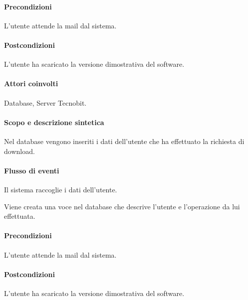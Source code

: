 \paragraph{Precondizioni} L'utente attende la mail dal sistema.
\paragraph{Postcondizioni} L'utente ha scaricato la versione dimostrativa del software.

\paragraph{Attori coinvolti}Database, Server Tecnobit.
\paragraph{Scopo e descrizione sintetica}
Nel database vengono inseriti i dati dell'utente che ha effettuato la richiesta di download.
\paragraph{Flusso di eventi}
\begin{elenconumerato}[\textbf{}]{\subsubsecindent}
\item Il sistema raccoglie i dati dell'utente.
\item Viene creata una voce nel database che descrive l'utente e l'operazione da lui effettuata.
\end{elenconumerato}
\paragraph{Precondizioni} L'utente attende la mail dal sistema.
\paragraph{Postcondizioni} L'utente ha scaricato la versione dimostrativa del software.

